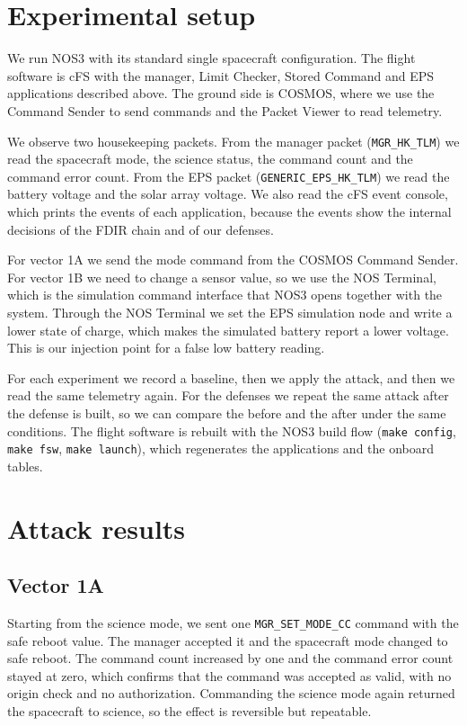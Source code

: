 \documentclass[conference,letterpaper,10pt]{IEEEtran}
\begin{document}
\section{Experimental setup}
We run NOS3 with its standard single spacecraft configuration. The flight software is cFS with the manager, Limit Checker, Stored Command and EPS applications described above. The ground side is COSMOS, where we use the Command Sender to send commands and the Packet Viewer to read telemetry.

We observe two housekeeping packets. From the manager packet (\texttt{MGR\_HK\_TLM}) we read the spacecraft mode, the science status, the command count and the command error count. From the EPS packet (\texttt{GENERIC\_EPS\_HK\_TLM}) we read the battery voltage and the solar array voltage. We also read the cFS event console, which prints the events of each application, because the events show the internal decisions of the FDIR chain and of our defenses.

For vector 1A we send the mode command from the COSMOS Command Sender. For vector 1B we need to change a sensor value, so we use the NOS Terminal, which is the simulation command interface that NOS3 opens together with the system. Through the NOS Terminal we set the EPS simulation node and write a lower state of charge, which makes the simulated battery report a lower voltage. This is our injection point for a false low battery reading.

For each experiment we record a baseline, then we apply the attack, and then we read the same telemetry again. For the defenses we repeat the same attack after the defense is built, so we can compare the before and the after under the same conditions. The flight software is rebuilt with the NOS3 build flow (\texttt{make config}, \texttt{make fsw}, \texttt{make launch}), which regenerates the applications and the onboard tables.

\section{Attack results}

\subsection{Vector 1A}
Starting from the science mode, we sent one \texttt{MGR\_SET\_MODE\_CC} command with the safe reboot value. The manager accepted it and the spacecraft mode changed to safe reboot. The command count increased by one and the command error count stayed at zero, which confirms that the command was accepted as valid, with no origin check and no authorization. Commanding the science mode again returned the spacecraft to science, so the effect is reversible but repeatable.
\end{document}
